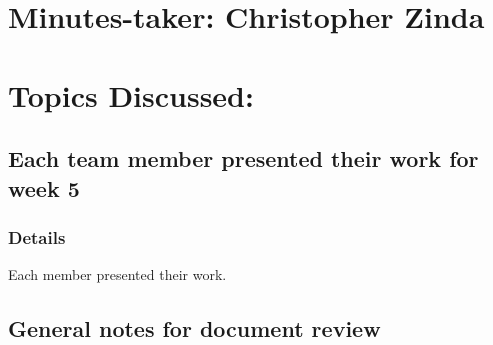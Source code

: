 \documentclass[11pt]{meetingmins} %
\begin{document}
\maketitle

\section{Minutes-taker: Christopher Zinda}

\section{Topics Discussed:}

\subsection{Each team member presented their work for week 5}
\subsubsection{Details}
\begin{hiddensubitems}
    \item
    Each member presented their work.
\end{hiddensubitems}

\subsection{General notes for document review}
\end{document}
